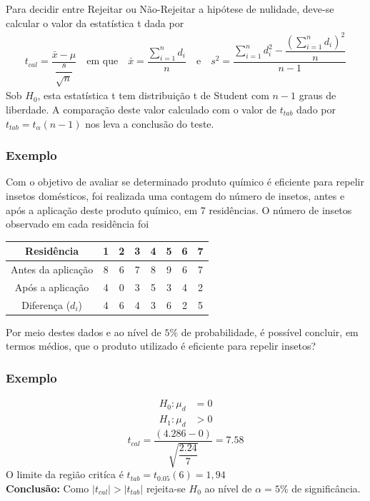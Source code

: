 \documentclass[14pt,aspectratio=1610]{beamer}
\newcommand{\bx}{\ensuremath{\bar{x}}}
\newcommand{\Ho}{\ensuremath{H_{0}}}
\begin{document}
\begin{frame}{}
\frametitle{}
\begin{block}{}
\justifying
Para decidir entre Rejeitar ou Não-Rejeitar a hipótese de nulidade, deve-se calcular o valor da estatística t dada por
\begin{align*}
t_{cal}=\dfrac{\bx-\mu}{\dfrac{s}{\sqrt{n}}}\quad \textrm{em que}\quad \bx=\dfrac{\displaystyle \sum_{i=1}^{n}d_{i}}{n}\quad \textrm{e}\quad 
s^{2}=\dfrac{\displaystyle \sum_{i=1}^{n}d_{i}^{2}-\dfrac{(\displaystyle \sum_{i=1}^{n}d_{i})^{2}}{n}}{n-1}
\end{align*}
Sob $\Ho$, esta estatística t tem distribuição t de Student com $n-1$ graus de liberdade. A comparação deste valor calculado com o valor de $t_{tab}$ dado por 
$t_{tab}=t_{\alpha}(n-1)$ nos leva a conclusão do teste.
\end{block}
\end{frame}

\begin{frame}{}
\frametitle{Exemplo}
\begin{block}{}
\justifying
Com o objetivo de avaliar se determinado produto químico é eficiente para repelir insetos domésticos, foi realizada uma 
contagem do número de insetos, antes e após a aplicação deste produto químico, em 7 residências. O número de insetos 
observado em cada residência foi
\begin{table}[]
\begin{tabular}{c|ccccccc}
             Residência & 1 & 2 & 3 & 4 & 5 & 6 & 7\\ \hline
Antes da aplicação & 8 & 6 & 7 & 8 & 9 & 6 & 7 \\ 
Após a aplicação    & 4 & 0 & 3 & 5 & 3 & 4 & 2 \\ \hline
Diferença ($d_{i}$)      & 4 & 6 & 4 & 3 & 6 & 2 & 5 \\ \hline
\end{tabular}
\end{table}
Por meio destes dados e ao nível de $5\%$ de probabilidade, é possível concluir, em termos médios, que o produto 
utilizado é eficiente para repelir insetos?
\end{block}
\end{frame}

\begin{frame}{}
\frametitle{Exemplo}
\begin{block}{}
\justifying
\begin{align*}
H_{0}: \mu_{d}&=0 \\ 
H_{1}: \mu_{d}&> 0
\end{align*}
$$t_{cal}=\dfrac{(4.286-0)}{\sqrt{\dfrac{2.24}{7}}}=7.58$$
O limite da região critíca é $t_{tab}=t_{0.05}(6)=1,94$\\
\textbf{Conclusão:} Como $|t_{cal}|>|t_{tab}|$ rejeita-se $\Ho$ ao nível de $\alpha=5\%$ de significância.
\end{block}
\end{frame}
\end{document}
